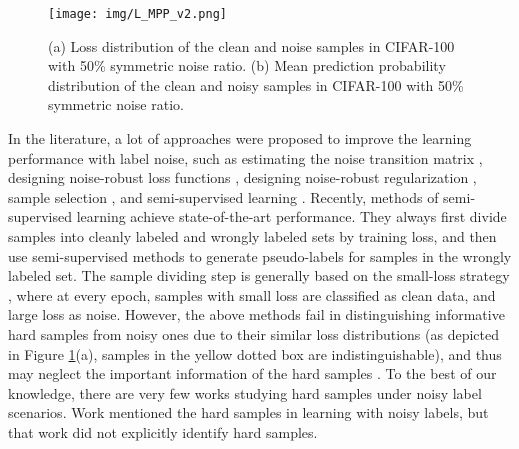 \documentclass[letterpaper]{article} \usepackage{aaai22}  \usepackage{times}  \usepackage{helvet}  \usepackage{courier}  \usepackage[hyphens]{url}  \usepackage{graphicx} \urlstyle{rm} \def\UrlFont{\rm}  \usepackage{natbib}  \usepackage{caption} \DeclareCaptionStyle{ruled}{labelfont=normalfont,labelsep=colon,strut=off} \frenchspacing  \setlength{\pdfpagewidth}{8.5in}  \setlength{\pdfpageheight}{11in}  \usepackage{algorithm}
\begin{document}
\begin{figure}[]
  \centering
  \texttt{[image: img/L\_MPP\_v2.png]}
\caption{(a) Loss distribution of the clean and noise samples in CIFAR-100 with 50\% symmetric noise ratio. (b) Mean prediction probability distribution of the clean and noisy samples in CIFAR-100 with 50\% symmetric noise ratio.}
  \label{fig:L_MPP}
\end{figure}

In the literature, a lot of approaches were proposed to improve the learning performance with label noise, such as estimating the noise transition matrix \cite{goldberger2016training,patrini2017making}, designing noise-robust loss functions \cite{ghosh2017robust,2019Curriculum,xu2019l_dmi}, designing noise-robust regularization \cite{2020Early,Tanno2020Learning}, sample selection \cite{han2018co,chen2019understanding}, and semi-supervised learning \cite{2020DivideMix,2021LongReMix}. Recently, methods of semi-supervised learning achieve state-of-the-art performance. They always first divide samples into cleanly labeled and wrongly labeled sets by training loss, and then use semi-supervised methods to generate pseudo-labels for samples in the wrongly labeled set. The sample dividing step is generally based on the small-loss strategy \cite{2019How}, where at every epoch, samples with small loss are classified as clean data, and large loss as noise. However, the above methods fail in distinguishing informative hard samples from noisy ones due to their similar loss distributions (as depicted in Figure \ref{fig:L_MPP}(a), samples in the yellow dotted box are indistinguishable), and thus may neglect the important information of the hard samples \cite{xiao2015learning}. To the best of our knowledge, there are very few works studying hard samples under noisy label scenarios. Work \cite{wang2019symmetric} mentioned the hard samples in learning with noisy labels, but that work did not explicitly identify hard samples.
\end{document}
